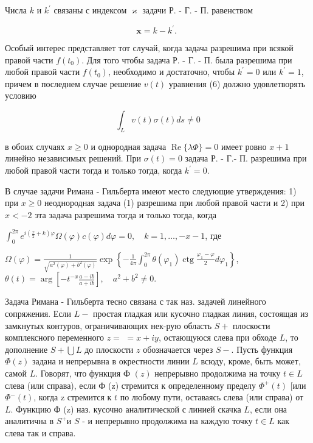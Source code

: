\documentclass[10pt]{article}
\begin{document}
Числа $k$ и $k^{\prime}$ связаны с индексом $\varkappa$ задачи Р. - Г. - П. равенством



\[

\boldsymbol{x}=k-k^{\prime} \text {. }

\]



Особый интерес представляет тот случай, когда задача разрешима при всякой правой части $f\left(t_{0}\right)$. Для того чтобы задача Р. - Г. - П. была разрешима при любой правой части $f\left(t_{0}\right)$, необходимо и достаточно, чтобы $k^{\prime}=0$ или $k^{\prime}=1$, причем в последнем случае решение $v(t)$ уравнения (6) должно удовлетворять условию



\[

\int_{L} v(t) \sigma(t) d s \neq 0

\]



в обоих случаях $x \geqslant 0$ и однородная задача $\operatorname{Re}\{\lambda \Phi\}=0$ имеет ровно $x+1$ линейно независимых решений. При $\sigma(t)=0$ задача Р. - Г.- П. разрешима при любой правой части тогда и только тогда, когда $k^{\prime}=0$.



В случае задачи Римана - Гильберта имеют место следующие утверждения: 1) при $x \geqslant 0$ неоднородная задача (1) разрешима при любой правой части и 2) при $x<-2$ эта задача разрешима тогда и только тогда, когда



$\int_{0}^{2 \pi} e^{i\left(\frac{x}{2}+k\right) \varphi} \Omega(\varphi) c(\varphi) d \varphi=0, \quad k=1, \ldots,-x-1$, где



$\Omega(\varphi)=\frac{1}{\sqrt{a^{2}(\varphi)+b^{2}(\varphi)}} \exp \left\{-\frac{1}{4 \pi} \int_{0}^{2 \pi} \theta\left(\varphi_{1}\right) \operatorname{ctg} \frac{\varphi_{1}-\varphi}{2} d \varphi_{1}\right\}$, $\theta(t)=\arg \left[-t^{-x} \frac{a-i b}{a+i b}\right], \quad a^{2}+b^{2} \neq 0$.



Задача Римана - Гильберта тесно связана с так наз. задачей линейного сопряжения. Если $L-$ простая гладкая или кусочно гладкая линия, состоящая из замкнутых контуров, ограничивающих нек-рую область $S+$ плоскости комплексного переменного $z=$ $=x+i y$, остающуюся слева при обходе $L$, то дополнение $S+\bigcup L$ до плоскости $z$ обозначается через $S-$. Пусть функция $\Phi(z)$ задана и непрерывна в окрестности линии $L$ всюду, кроме, быть может, самой $L$. Говорят, что функция Ф $(z)$ непрерывно продолжима на точку $t \in L$ слева (или справа), если Ф (z) стремится к определенному пределу $\Phi^{+}(t)$ [или $\Phi^{-}(t)$, когда z стремится к $t$ по любому пути, оставаясь слева (или справа) от $L$. Функцию Ф (z) наз. кусочно аналитической с линией скачка $L$, если она аналитична в $S^{+}$и $S$ - и непрерывно продолжима на каждую точку $t \in L$ как слева так и справа.
\end{document}
